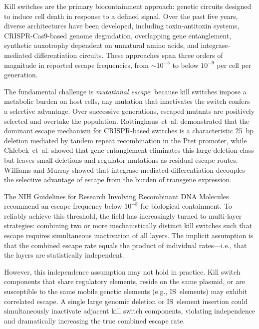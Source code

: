 \documentclass[journal=asbcd6,manuscript=article]{achemso}
\begin{document}
Kill switches are the primary biocontainment approach: genetic circuits designed to induce cell death in response to a defined signal. Over the past five years, diverse architectures have been developed, including toxin-antitoxin systems, CRISPR-Cas9-based genome degradation\cite{Rottinghaus2022}, overlapping gene entanglement\cite{Chlebek2023,Foo2025}, synthetic auxotrophy dependent on unnatural amino acids\cite{Chang2023}, and integrase-mediated differentiation circuits\cite{Williams2022}. These approaches span three orders of magnitude in reported escape frequencies, from $\sim$$10^{-5}$ to below $10^{-9}$ per cell per generation.

The fundamental challenge is \emph{mutational escape}: because kill switches impose a metabolic burden on host cells, any mutation that inactivates the switch confers a selective advantage. Over successive generations, escaped mutants are positively selected and overtake the population. Rottinghaus~et~al.\cite{Rottinghaus2022} demonstrated that the dominant escape mechanism for CRISPR-based switches is a characteristic 25~bp deletion mediated by tandem repeat recombination in the Ptet promoter, while Chlebek~et~al.\cite{Chlebek2023} showed that gene entanglement eliminates this large-deletion class but leaves small deletions and regulator mutations as residual escape routes. Williams and Murray\cite{Williams2022} showed that integrase-mediated differentiation decouples the selective advantage of escape from the burden of transgene expression.

The NIH Guidelines for Research Involving Recombinant DNA Molecules recommend an escape frequency below $10^{-8}$ for biological containment\cite{Rottinghaus2022}. To reliably achieve this threshold, the field has increasingly turned to multi-layer strategies: combining two or more mechanistically distinct kill switches such that escape requires simultaneous inactivation of all layers\cite{Pantoja2022}. The implicit assumption is that the combined escape rate equals the product of individual rates---i.e., that the layers are statistically independent.

However, this independence assumption may not hold in practice. Kill switch components that share regulatory elements, reside on the same plasmid, or are susceptible to the same mobile genetic elements (e.g., IS~elements) may exhibit correlated escape. A single large genomic deletion or IS~element insertion could simultaneously inactivate adjacent kill switch components, violating independence and dramatically increasing the true combined escape rate.
\end{document}
